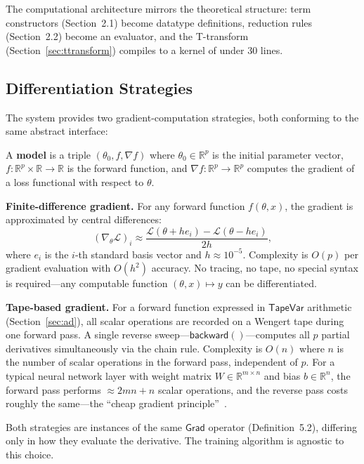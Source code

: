\documentclass{lmcs}
\theoremstyle{plain}
\theoremstyle{definition}
\newcommand{\RR}{\mathbb{R}}
\begin{document}
The computational architecture mirrors the theoretical structure: term
constructors (Section~2.1) become datatype definitions, reduction rules
(Section~2.2) become an evaluator, and the T-transform
(Section~\ref{sec:ttransform}) compiles to a kernel of under 30 lines.

\subsection{Differentiation Strategies}

The system provides two gradient-computation strategies, both conforming to
the same abstract interface:

\begin{defi}
A \textbf{model} is a triple $(\theta_0, f, \nabla f)$ where
$\theta_0 \in \RR^p$ is the initial parameter vector,
$f : \RR^p \times \RR \to \RR$ is the forward function, and
$\nabla f : \RR^p \to \RR^p$ computes the gradient of a loss functional
with respect to $\theta$.
\end{defi}

\textbf{Finite-difference gradient.} For any forward function $f(\theta, x)$,
the gradient is approximated by central differences:
\[
(\nabla_\theta \mathcal{L})_i \approx
\frac{\mathcal{L}(\theta + h e_i) - \mathcal{L}(\theta - h e_i)}{2h},
\]
where $e_i$ is the $i$-th standard basis vector and $h \approx 10^{-5}$.
Complexity is $O(p)$ per gradient evaluation with $O(h^2)$ accuracy. No
tracing, no tape, no special syntax is required---any computable function
$(\theta, x) \mapsto y$ can be differentiated.

\textbf{Tape-based gradient.} For a forward function expressed in
$\mathsf{TapeVar}$ arithmetic (Section~\ref{sec:ad}), all scalar operations
are recorded on a Wengert tape during one forward pass. A single reverse
sweep---$\mathsf{backward}()$---computes all $p$ partial derivatives
simultaneously via the chain rule. Complexity is $O(n)$ where $n$ is the
number of scalar operations in the forward pass, independent of $p$. For a
typical neural network layer with weight matrix $W \in \RR^{m \times n}$ and
bias $b \in \RR^n$, the forward pass performs $\approx 2mn + n$ scalar
operations, and the reverse pass costs roughly the same---the ``cheap
gradient principle''~\cite{griewank2008}.

Both strategies are instances of the same $\mathsf{Grad}$ operator
(Definition~5.2), differing only in how they evaluate the derivative.
The training algorithm is agnostic to this choice.
\end{document}
